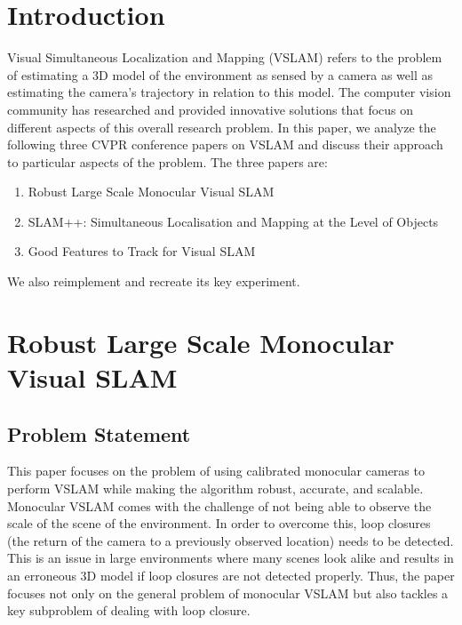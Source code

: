 \documentclass[10pt,twocolumn,letterpaper]{article}
\begin{document}
\section{Introduction}
Visual Simultaneous Localization and Mapping (VSLAM) refers to the problem of estimating a 3D model of the environment as sensed by a camera as well as estimating the 
camera's trajectory in relation to this model. The computer vision community has researched 
and provided innovative solutions that focus on different aspects of this overall research problem. In this paper, we analyze the following three CVPR conference papers on VSLAM and discuss their approach to particular aspects of the problem. The three papers are: 
\begin{enumerate}
\item Robust Large Scale Monocular Visual SLAM \cite{Bourmaud_2015_CVPR}
\item SLAM++: Simultaneous Localisation and Mapping at the Level of Objects \cite{Salas-Moreno_2013_CVPR}
\item Good Features to Track for Visual SLAM \cite{Zhang_2015_CVPR} 
\end{enumerate}
We also reimplement \cite{Zhang_2015_CVPR} and recreate its key experiment.

\section{Robust Large Scale Monocular Visual SLAM}
\subsection{Problem Statement}
This paper focuses on the problem of using calibrated monocular cameras to perform VSLAM 
while making the 
algorithm robust, accurate, and scalable. Monocular VSLAM comes with the challenge of not being able to 
observe the scale of the scene of the environment. In order to overcome this, loop closures (the return of the camera to a previously observed location) needs to be
 detected. This is an issue in large environments where many scenes look alike and results in an erroneous 
3D model if loop closures are not detected properly. Thus, the paper focuses not only on the general 
problem of monocular VSLAM but also tackles 
a key subproblem of dealing with loop closure.
\end{document}
